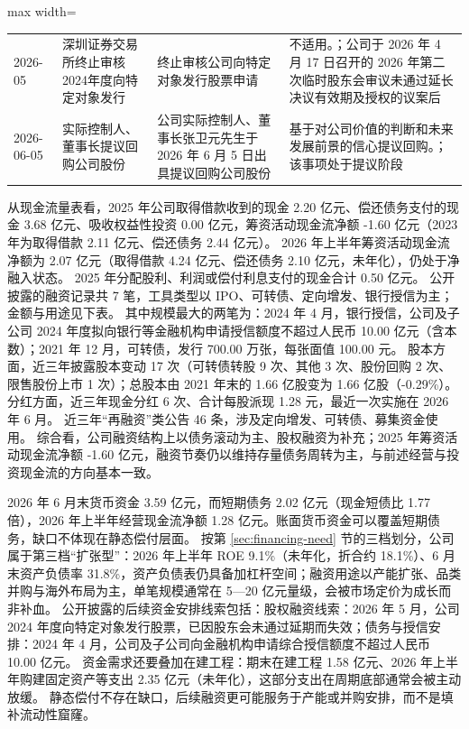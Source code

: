 \begin{center}
\begin{adjustbox}{max width=\textwidth}
\begin{tabular}{@{}p{1.45cm}p{2.55cm}p{4.05cm}p{4.95cm}@{}}
2026-05 & 深圳证券交易所终止审核2024年度向特定对象发行 & 终止审核公司向特定对象发行股票申请 & 不适用。；公司于 2026 年 4 月 17 日召开的 2026 年第二次临时股东会审议未通过延长决议有效期及授权的议案后 \\
2026-06-05 & 实际控制人、董事长提议回购公司股份 & 公司实际控制人、\allowbreak{}董事长张卫元先生于 2026 年 6 月 5 日出具提议回购公司股份 & 基于对公司价值的判断和未来发展前景的信心提议回购。；该事项处于提议阶段 \\
\bottomrule
\end{tabular}
\end{adjustbox}
\end{center}

 从现金流量表看，2025 年公司取得借款收到的现金 2.20 亿元、偿还债务支付的现金 3.68 亿元、吸收权益性投资 0.00 亿元，筹资活动现金流净额 -1.60 亿元（2023 年为取得借款 2.11 亿元、偿还债务 2.44 亿元）。 2026 年上半年筹资活动现金流净额为 2.07 亿元（取得借款 4.24 亿元、偿还债务 2.10 亿元，未年化），仍处于净融入状态。 2025 年分配股利、利润或偿付利息支付的现金合计 0.50 亿元。 公开披露的融资记录共 7 笔，工具类型以 IPO、可转债、定向增发、银行授信为主；金额与用途见下表。 其中规模最大的两笔为：2024 年 4 月，银行授信，公司及子公司 2024 年度拟向银行等金融机构申请授信额度不超过人民币 10.00 亿元（含本数）；2021 年 12 月，可转债，发行 700.00 万张，每张面值 100.00 元。 股本方面，近三年披露股本变动 17 次（可转债转股 9 次、其他 3 次、股份回购 2 次、限售股份上市 1 次）；总股本由 2021 年末的 1.66 亿股变为 1.66 亿股（-0.29\%）。 分红方面，近三年现金分红 6 次、合计每股派现 1.28 元，最近一次实施在 2026 年 6 月。 近三年“再融资”类公告 46 条，涉及定向增发、可转债、募集资金使用。 综合看，公司融资结构上以债务滚动为主、股权融资为补充；2025 年筹资活动现金流净额 -1.60 亿元，融资节奏仍以维持存量债务周转为主，与前述经营与投资现金流的方向基本一致。

 2026 年 6 月末货币资金 3.59 亿元，而短期债务 2.02 亿元（现金短债比 1.77 倍），2026 年上半年经营现金流净额 1.28 亿元。账面货币资金可以覆盖短期债务，缺口不体现在静态偿付层面。 按第 \ref{sec:financing-need} 节的三档划分，公司属于第三档“扩张型”：2026 年上半年 ROE 9.1\%（未年化，折合约 18.1\%）、6 月末资产负债率 31.8\%，资产负债表仍具备加杠杆空间；融资用途以产能扩张、品类并购与海外布局为主，单笔规模通常在 5---20 亿元量级，会被市场定价为成长而非补血。 公开披露的后续资金安排线索包括：股权融资线索：2026 年 5 月，公司 2024 年度向特定对象发行股票，已因股东会未通过延期而失效；债务与授信安排：2024 年 4 月，公司及子公司向金融机构申请综合授信额度不超过人民币 10.00 亿元。 资金需求还要叠加在建工程：期末在建工程 1.58 亿元、2026 年上半年购建固定资产等支出 2.35 亿元（未年化），这部分支出在周期底部通常会被主动放缓。 静态偿付不存在缺口，后续融资更可能服务于产能或并购安排，而不是填补流动性窟窿。




